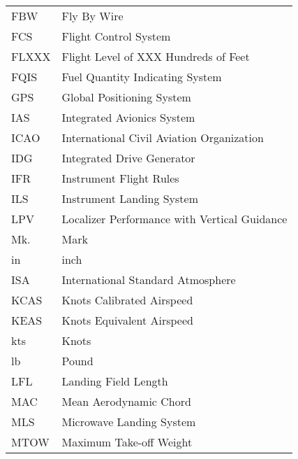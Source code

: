 {\begin{longtable*}{@{}l @{\quad=\quad} l@{}}
    FBW & Fly By Wire \\
    FCS & Flight Control System \\
    FLXXX & Flight Level of XXX Hundreds of Feet \\
    FQIS & Fuel Quantity Indicating System \\
    GPS & Global Positioning System \\
    IAS & Integrated Avionics System \\
    ICAO & International Civil Aviation Organization \\
    IDG & Integrated Drive Generator \\
    IFR & Instrument Flight Rules \\
    ILS & Instrument Landing System \\
    LPV & Localizer Performance with Vertical Guidance \\
    Mk. & Mark \\
    in & inch \\
    ISA & International Standard Atmosphere \\
    KCAS & Knots Calibrated Airspeed \\
    KEAS & Knots Equivalent Airspeed \\
    kts & Knots \\
    lb & Pound \\
    LFL & Landing Field Length \\
    MAC & Mean Aerodynamic Chord \\
    MLS & Microwave Landing System \\
    MTOW & Maximum Take-off Weight \\

\end{longtable*}}
